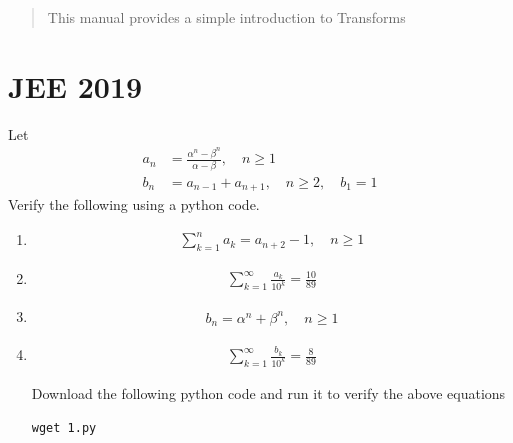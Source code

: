 \documentclass[journal,12pt,twocolumn]{IEEEtran}
\renewcommand\thesection{\arabic{section}}
\begin{document}
% 
\maketitle
\tableofcontents
\renewcommand{\thefigure}{\theenumi}
\renewcommand{\thetable}{\theenumi}
\bigskip

\begin{abstract}
This manual provides a simple introduction to Transforms
\end{abstract}
\section{JEE 2019}
Let 
\begin{align}
	a_n &= \frac{\alpha^{n}-\beta^{n}}{\alpha - \beta}, \quad n \ge 1
	\\
	b_n &= a_{n-1} + a_{n+1}, \quad n \ge 2, \quad b_1 =1
	\label{eq:10-orig-diff}
\end{align}
Verify the following using a python code.

\begin{enumerate}[label=\thesection.\arabic*
,ref=\thesection.\theenumi]
\item 
\begin{align}
	\sum_{k=1}^{n}a_k = a_{n+2}-1, \quad n \ge 1
	\label{eq:1_1}
\end{align}
 \item 
\begin{align}
	\sum_{k=1}^{\infty}\frac{a_k}{10^k} =\frac{10}{89}
	\label{eq:1_2}
\end{align}
 \item 
\begin{align}
	b_n =\alpha^n + \beta^n, \quad n \ge1
	\label{eq:1_3}
\end{align}
 \item 
\begin{align}
	\sum_{k=1}^{\infty}\frac{b_k}{10^k} =\frac{8}{89}
	\label{eq:1_4}
\end{align}

\solution
Download the following python code and run it to verify the above equations 
\begin{lstlisting}
wget 1.py
\end{lstlisting}
\end{enumerate}
\end{document}
